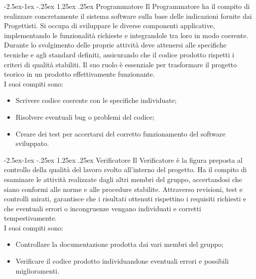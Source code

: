 \documentclass[a4paper,12pt]{article}
\makeatletter
\renewcommand\paragraph{\@startsection{paragraph}{4}{\z@}%
            {-2.5ex\@plus -1ex \@minus -.25ex}%
            {1.25ex \@plus .25ex}%
            {\normalfont\normalsize\bfseries}}
\makeatother
\begin{document}
            \paragraph{Programmatore}
                Il Programmatore ha il compito di realizzare concretamente il sistema software sulla base delle indicazioni fornite dai Progettisti.
                Si occupa di sviluppare le diverse componenti applicative, implementando le funzionalità richieste e integrandole tra loro in modo coerente.
                Durante lo svolgimento delle proprie attività deve attenersi alle specifiche tecniche e agli standard definiti, assicurando che il codice prodotto rispetti i criteri di qualità stabiliti.
                Il suo ruolo è essenziale per trasformare il progetto teorico in un prodotto effettivamente funzionante.\\
                I suoi compiti sono:
                \begin{itemize}
                    \item Scrivere codice coerente con le specifiche individuate;
                    \item Risolvere eventuali bug o problemi del codice;
                    \item Creare dei test per accertarsi del corretto funzionamento del software sviluppato.
                \end{itemize}

            \paragraph{Verificatore}
                Il Verificatore è la figura preposta al controllo della qualità del lavoro svolto all'interno del progetto.
                Ha il compito di esaminare le attività realizzate dagli altri membri del gruppo, accertandosi che siano conformi alle norme e alle procedure stabilite.
                Attraverso revisioni, test e controlli mirati, garantisce che i risultati ottenuti rispettino i requisiti richiesti e che eventuali errori o incongruenze vengano individuati e corretti tempestivamente.\\
                I suoi compiti sono:
                \begin{itemize}
                    \item Controllare la documentazione prodotta dai vari membri del gruppo;
                    \item Verificare il codice prodotto individuandone eventuali errori e possibili miglioramenti.
                \end{itemize}
\end{document}
